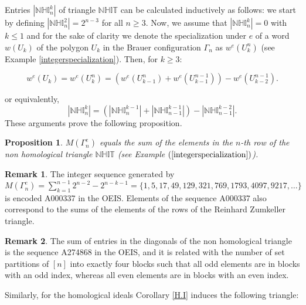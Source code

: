 \documentclass[10pt,twoside]{article}
\newtheorem{prop}{Proposition}
\theoremstyle{definition}
\newtheorem{Nota}{Remark}
\begin{document}
Entries $|\mathbb{NHI}_n^k|$ of triangle $\mathbb{NHIT}$ can be calculated inductively as follows: we start by defining $|\mathbb{NHI}_n^2|=2^{n-3}$ for all $n\geq 3$. Now, we assume that $|\mathbb{NHI}_n^k|=0$ with $k\leq 1$ and for the sake of clarity we denote the specialization under $e$ of a word $w(U_k)$ of the polygon $U_k$ in the Brauer configuration $\Gamma_n$ as $w^{e}(U_k^n)$ (see Example \ref{integerspecialization}). Then, for $k\geq 3$:

\[w^{e}(U_k)=w^{e}(U_k^n)=(w^{e}(U_{k-1}^n)+ w^{e}(U_{k-1}^{n-1}))-w^{e}(U_{k-2}^{n-1}).\]  

or equivalently,
\[|\mathbb{NHI}_n^k|=(|\mathbb{NHI}_n^{k-1}|+ |\mathbb{NHI}_{n-1}^{k-1}|)-|\mathbb{NHI}_{n-1}^{k-2}|.\]  These arguments prove the following proposition.


\addtocounter{prop}{13}
\begin{prop}
$M(\Gamma_n^e)$ equals the sum of the elements in the $n$-th row of the non homological triangle $\mathbb{NHIT}$ (see Example $\mathrm(\ref{integerspecialization})$).
\end{prop}

\addtocounter{Nota}{5}
\begin{Nota}
The integer sequence generated by $M(\Gamma_n^e)=\displaystyle\sum_{k=1}^{n-1} 2^{n-2}-2^{n-k-1}=\{1,5,17,49,129,321,769,1793,4097,9217, \ldots\}$ is encoded A000337 in the OEIS. Elements of the sequence A000337 also correspond to the sums of the elements of the rows of the Reinhard Zumkeller triangle.
\end{Nota}
\begin{Nota}\label{properties}
The sum of  entries in the diagonals of the non homological triangle is the sequence A274868 in the OEIS, and it is related with the number of set partitions of $[n]$ into exactly four blocks such that all odd elements are in blocks with an odd index, whereas all even elements are in blocks with an even index.
\end{Nota}

Similarly, for the homological ideals Corollary \ref{H.I} induces the following triangle:
\end{document}

